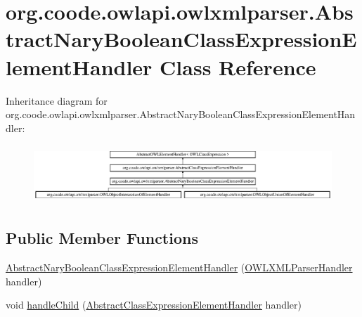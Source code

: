 \hypertarget{classorg_1_1coode_1_1owlapi_1_1owlxmlparser_1_1_abstract_nary_boolean_class_expression_element_handler}{\section{org.\-coode.\-owlapi.\-owlxmlparser.\-Abstract\-Nary\-Boolean\-Class\-Expression\-Element\-Handler Class Reference}
\label{classorg_1_1coode_1_1owlapi_1_1owlxmlparser_1_1_abstract_nary_boolean_class_expression_element_handler}
}
Inheritance diagram for org.\-coode.\-owlapi.\-owlxmlparser.\-Abstract\-Nary\-Boolean\-Class\-Expression\-Element\-Handler\-:\begin{figure}[H]
\begin{center}
\leavevmode
\includegraphics[height=2.226640cm]{classorg_1_1coode_1_1owlapi_1_1owlxmlparser_1_1_abstract_nary_boolean_class_expression_element_handler}
\end{center}
\end{figure}
\subsection*{Public Member Functions}
\begin{DoxyCompactItemize}
\item 
\hyperlink{classorg_1_1coode_1_1owlapi_1_1owlxmlparser_1_1_abstract_nary_boolean_class_expression_element_handler_a18dade9a941451bb96c5135436ef4142}{Abstract\-Nary\-Boolean\-Class\-Expression\-Element\-Handler} (\hyperlink{classorg_1_1coode_1_1owlapi_1_1owlxmlparser_1_1_o_w_l_x_m_l_parser_handler}{O\-W\-L\-X\-M\-L\-Parser\-Handler} handler)
\item 
void \hyperlink{classorg_1_1coode_1_1owlapi_1_1owlxmlparser_1_1_abstract_nary_boolean_class_expression_element_handler_a39906545a09747c8f88d73359428ff92}{handle\-Child} (\hyperlink{classorg_1_1coode_1_1owlapi_1_1owlxmlparser_1_1_abstract_class_expression_element_handler}{Abstract\-Class\-Expression\-Element\-Handler} handler)
\end{DoxyCompactItemize}
